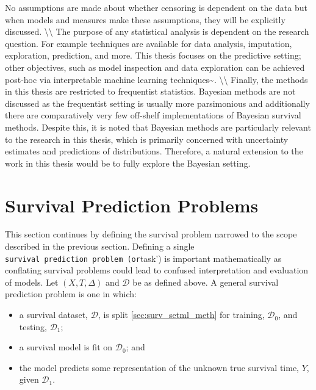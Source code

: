 \documentclass[
  letterpaper,
]{scrbook}
\providecommand{\tightlist}{%
  \setlength{\itemsep}{0pt}\setlength{\parskip}{0pt}}\usepackage{longtable,booktabs,array}
\theoremstyle{plain}
\theoremstyle{definition}
\theoremstyle{remark}
\begin{document}
No assumptions are made about whether censoring is dependent on the data
but when models and measures make these assumptions, they will be
explicitly discussed. \textbackslash\textbackslash{} The purpose of any
statistical analysis is dependent on the research question. For example
techniques are available for data analysis, imputation, exploration,
prediction, and more. This thesis focuses on the predictive setting;
other objectives, such as model inspection and data exploration can be
achieved post-hoc via interpretable machine learning
techniques\textasciitilde{}\cite{Molnar2019}.
\textbackslash\textbackslash{} Finally, the methods in this thesis are
restricted to frequentist statistics. Bayesian methods are not discussed
as the frequentist setting is usually more parsimonious and additionally
there are comparatively very few off-shelf implementations of Bayesian
survival methods. Despite this, it is noted that Bayesian methods are
particularly relevant to the research in this thesis, which is primarily
concerned with uncertainty estimates and predictions of distributions.
Therefore, a natural extension to the work in this thesis would be to
fully explore the Bayesian setting.

\section{Survival Prediction Problems}
\label{sec:surv_set_types}

This section continues by defining the survival problem narrowed to the
scope described in the previous section. Defining a single
\texttt{survival\ prediction\ problem\textquotesingle{}\ (or}task') is
important mathematically as conflating survival problems could lead to
confused interpretation and evaluation of models. Let \((X,T,\Delta)\)
and \(\mathcal{D}\) be as defined above. A general survival prediction
problem is one in which:

\begin{itemize}
\tightlist
\item
  a survival dataset, \(\mathcal{D}\), is split
  \ref{sec:surv_setml_meth} for training, \(\mathcal{D}_0\), and
  testing, \(\mathcal{D}_1\);
\item
  a survival model is fit on \(\mathcal{D}_0\); and
\item
  the model predicts some representation of the unknown true survival
  time, \(Y\), given \(\mathcal{D}_1\).
\end{itemize}
\end{document}
